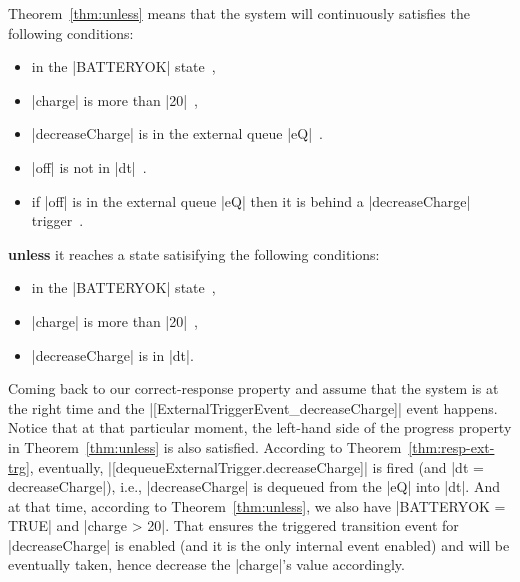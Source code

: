 Theorem~\ref{thm:unless} means that the system will continuously
satisfies the following conditions:
\begin{itemize}
\item in the |BATTERYOK| state~,
  
\item |charge| is more than |20|~,
  
\item |decreaseCharge| is in the external queue |eQ|~.
  
\item |off| is not in |dt|~.
  
\item if |off| is in the external queue |eQ| then it is behind a
  |decreaseCharge| trigger~.
\end{itemize}
\textbf{unless} it reaches a state satisifying the following conditions:
\begin{itemize}
\item in the |BATTERYOK| state~,
  
\item |charge| is more than |20|~,
  
\item |decreaseCharge| is in |dt|.
\end{itemize}

Coming back to our correct-response property and assume that the
system is at the right time and the
|[ExternalTriggerEvent_decreaseCharge]| event happens.  Notice that at
that particular moment, the left-hand side of the progress property in
Theorem~\ref{thm:unless} is also satisfied.  According to
Theorem~\ref{thm:resp-ext-trg}, eventually,
|[dequeueExternalTrigger.decreaseCharge]| is fired (and %
|dt = {decreaseCharge}|), %
i.e., |decreaseCharge| is dequeued from the |eQ| into |dt|. And at
that time, according to Theorem~\ref{thm:unless}, we also have
|BATTERYOK = TRUE| and |charge > 20|.  That ensures the triggered
transition event for |decreaseCharge| is enabled (and it is the only
internal event enabled) and will be eventually taken, hence decrease
the |charge|'s value accordingly.



